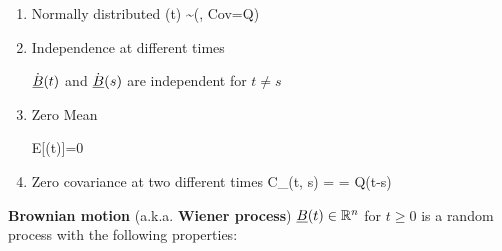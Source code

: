 \begin{enumerate}
\item Normally distributed
\beq
{\dot{\rvB}}(t) \sim \caln(, Cov=Q)
\eeq

\item Independence at different times

${\dot{\rvB}}(t)$ and ${\dot{\rvB}}(s)$ are independent for
$t\neq s$

\item Zero Mean

\beq E[{\dot{\rvB}}(t)]=0
\eeq

\item Zero covariance at two different times
\beq
C_{\dot{\rvB}}(t, s) =  = Q\delta(t-s)
\eeq



\end{enumerate}
{\bf Brownian motion} (a.k.a. {\bf Wiener process})
$\rvB(t)\in\RR^n$
for $t\geq 0$
is a random process with the
following properties:


